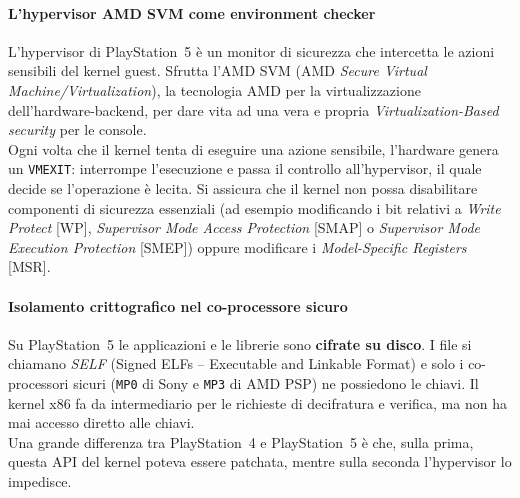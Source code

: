 \paragraph{L'hypervisor AMD SVM come environment checker}
L'hypervisor di PlayStation~5 è un monitor di sicurezza che intercetta le azioni sensibili del kernel guest. Sfrutta l'AMD SVM (AMD \textit{Secure Virtual Machine/Virtualization}), la tecnologia AMD per la virtualizzazione dell'hardware-backend, 
per dare vita ad una vera e propria \textit{Virtualization-Based security} per le console.\\
Ogni volta che il kernel tenta di eseguire una azione sensibile, l'hardware genera un \texttt{VMEXIT}: interrompe l'esecuzione e passa il controllo all'hypervisor, il quale decide se l'operazione è lecita.
Si assicura che il kernel non possa disabilitare componenti di sicurezza essenziali (ad esempio modificando i bit relativi a \textit{Write Protect} [WP], \textit{Supervisor Mode Access Protection} [SMAP] o \textit{Supervisor Mode Execution Protection} [SMEP]) oppure modificare i \textit{Model-Specific Registers} [MSR].

\paragraph{Isolamento crittografico nel co-processore sicuro}
Su PlayStation~5 le applicazioni e le librerie sono \textbf{cifrate su disco}. I file si chiamano \textit{SELF} (Signed ELFs -- Executable and Linkable Format) e solo i co-processori sicuri (\texttt{MP0} di Sony e \texttt{MP3} di AMD PSP) ne possiedono le chiavi. Il kernel x86 fa da intermediario per le richieste di decifratura e verifica, ma non ha mai accesso diretto alle chiavi.\\
Una grande differenza tra PlayStation~4 e PlayStation~5 è che, sulla prima, questa API del kernel poteva essere patchata, mentre sulla seconda l'hypervisor lo impedisce.


